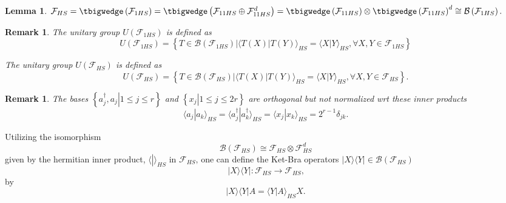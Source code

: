 \documentclass[aps, preprint]{revtex4}
\newtheorem{lemma}[theorem]{Lemma}
\newtheorem{remark}[theorem]{Remark}
\begin{document}
\begin{lemma}
$\mathcal{F}_{H S} = \tbigwedge \left (\mathcal{F}_{1 H S}\right ) = \tbigwedge \left (\mathcal{F}_{1 1 H S} \oplus \mathcal{F}_{1 1 H S}^{d}\right ) = \tbigwedge \left (\mathcal{F}_{1 1 H S}\right ) \otimes  \tbigwedge  \left (\mathcal{F}_{1 1 H S}\right )^{d} \cong \mathcal{B} \left (\mathcal{F}_{1 H S}\right )\text{.}$ 
\end{lemma}


\begin{remark}
The unitary group $U \left (\mathcal{F}_{1 H S}\right )$ is defined as
\begin{equation}U \left (\mathcal{F}_{1 H S}\right ) =\left \{\left .T \in \mathcal{B} \left (\mathcal{F}_{1 H S}\right )\right \vert  \langle \left .T \left (X\right )\right \vert T \left (Y\right ) \rangle _{H S} = \langle \left .X\right \vert Y \rangle _{H S} , \forall X ,Y \in \mathcal{F}_{1 H S}\right \}
\end{equation}

The unitary group $U \left (\mathcal{F}_{H S}\right )$ is defined as
\begin{equation}U \left (\mathcal{F}_{H S}\right ) =\left \{\left .T \in \mathcal{B} \left (\mathcal{F}_{H S}\right )\right \vert  \langle \left .T \left (X\right )\right \vert T \left (Y\right ) \rangle _{H S} = \langle \left .X\right \vert Y \rangle _{H S} , \forall X ,Y \in \mathcal{F}_{H S}\right \}\text{.}
\end{equation}
\end{remark}


\begin{remark}
The bases $\left \{\left .a_{j}^{ \dag } ,a_{j}\right \vert 1 \leq j \leq r\text{}\right \}$ and $\left \{\left .x_{j}\right \vert 1 \leq j \leq 2 r\right \}$ are orthogonal but not normalized wrt these inner products
\begin{equation} \langle \left .a_{j}\right \vert a_{k} \rangle _{H S} = \langle \left .a_{j}^{ \dag }\right \vert a_{k}^{ \dag } \rangle _{H S} = \langle \left .x_{j}\right \vert x_{k} \rangle _{H S} =2^{r -1} \delta _{j k}\text{.}
\end{equation}
\end{remark}

Utilizing the isomorphism
\begin{equation}\mathcal{B} \left (\mathcal{F}_{H S}\right ) \cong \mathcal{F}_{H S} \otimes \mathcal{F}_{H S}^{d}
\end{equation}given by the hermitian inner product, $ \langle \left .\text{}\right \vert  \rangle _{H S}$ in $\mathcal{F}_{H S}\text{,}$ one can define the Ket-Bra operators $\vert X \rangle  \langle Y\vert  \in \mathcal{B} \left (\mathcal{F}_{H S}\right )$
\begin{equation}\vert X \rangle  \langle Y\vert  :\mathcal{F}_{H S} \rightarrow \mathcal{F}_{H S}\text{,}
\end{equation}by
\begin{equation}\vert X \rangle  \langle Y\vert A = \langle \left .Y\right \vert A \rangle _{H S} X\text{.}
\end{equation}
\end{document}
